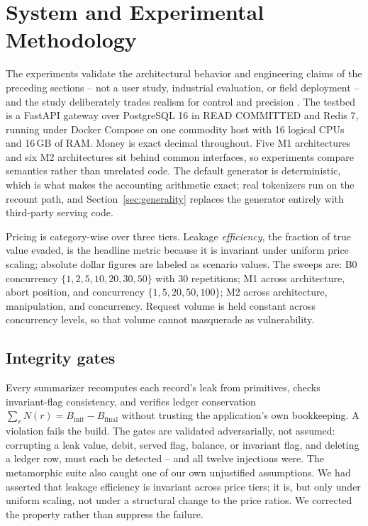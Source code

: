 \documentclass[manuscript,review,anonymous]{acmart}
\begin{document}
\section{System and Experimental Methodology}
\label{sec:method}
The experiments validate the architectural behavior and engineering claims of the
preceding sections -- not a user study, industrial evaluation, or field deployment -- and
the study deliberately trades realism for control and precision \citep{abc}. The testbed is a FastAPI gateway over PostgreSQL 16 in READ COMMITTED and Redis 7,
running under Docker Compose on one commodity host with 16 logical CPUs and 16\,GB of
RAM. Money is exact decimal throughout. Five M1 architectures and six M2 architectures
sit behind common interfaces, so experiments compare semantics rather than unrelated
code. The default generator is deterministic, which is what makes the accounting
arithmetic exact; real tokenizers run on the recount path, and
Section~\ref{sec:generality} replaces the generator entirely with third-party serving
code.

Pricing is category-wise over three tiers. Leakage \emph{efficiency}, the fraction of
true value evaded, is the headline metric because it is invariant under uniform price
scaling; absolute dollar figures are labeled as scenario values. The sweeps are: B0
concurrency $\{1,2,5,10,20,30,50\}$ with 30 repetitions; M1 across architecture, abort
position, and concurrency $\{1,5,20,50,100\}$; M2 across architecture, manipulation, and
concurrency. Request volume is held constant across concurrency levels, so that volume
cannot masquerade as vulnerability.

\subsection{Integrity gates}
Every summarizer recomputes each record's leak from primitives, checks invariant-flag
consistency, and verifies ledger conservation $\sum_r N(r) = B_{\mathrm{init}} -
B_{\mathrm{final}}$ without trusting the application's own bookkeeping. A violation fails
the build. The gates are validated adversarially, not assumed: corrupting a leak value,
debit, served flag, balance, or invariant flag, and deleting a ledger row, must each be
detected -- and all twelve injections were. The metamorphic suite also caught
one of our own unjustified assumptions. We had asserted that leakage efficiency is
invariant across price tiers; it is, but only under uniform scaling, not under a
structural change to the price ratios. We corrected the property rather than suppress the
failure.
\end{document}
